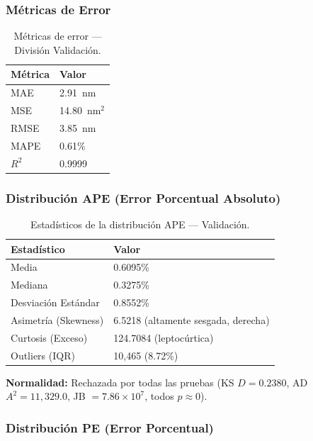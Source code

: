 \documentclass{article}
\begin{document}
\subsubsection{Métricas de Error}

\begin{table}[htbp]
\centering
\caption{Métricas de error — División Validación.}
\label{tab:val-metrics}
\begin{tabular}{ll}
\hline
Métrica & Valor \\
\hline
MAE  & 2.91~nm \\
MSE  & 14.80~nm$^2$ \\
RMSE & 3.85~nm \\
MAPE & 0.61\% \\
$R^2$ & 0.9999 \\
\hline
\end{tabular}
\end{table}

\subsubsection{Distribución APE (Error Porcentual Absoluto)}

\begin{table}[htbp]
\centering
\caption{Estadísticos de la distribución APE — Validación.}
\label{tab:val-ape}
\begin{tabular}{ll}
\hline
Estadístico & Valor \\
\hline
Media                    & 0.6095\% \\
Mediana                  & 0.3275\% \\
Desviación Estándar      & 0.8552\% \\
Asimetría (Skewness)     & 6.5218 (altamente sesgada, derecha) \\
Curtosis (Exceso)        & 124.7084 (leptocúrtica) \\
Outliers (IQR)           & 10,465 (8.72\%) \\
\hline
\end{tabular}
\end{table}

\textbf{Normalidad:} Rechazada por todas las pruebas (KS $D = 0.2380$, AD $A^2 = 11{,}329.0$, JB $= 7.86 \times 10^7$, todos $p \approx 0$).

\subsubsection{Distribución PE (Error Porcentual)}
\end{document}
